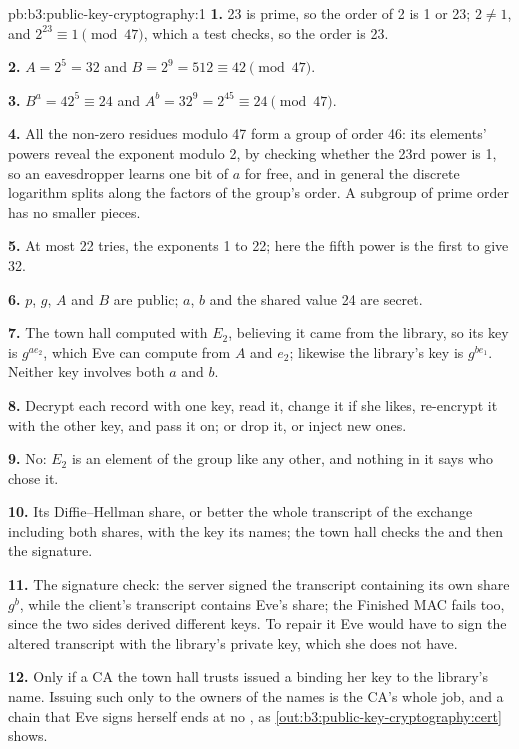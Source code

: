 \begin{solution}{pb:b3:public-key-cryptography:1}
\textbf{1.} 23 is prime, so the order of 2 is 1 or 23; $2 \ne 1$, and $2^{23} \equiv 1 \pmod{47}$, which a test checks, so the order is 23.

\textbf{2.} $A = 2^5 = 32$ and $B = 2^9 = 512 \equiv 42 \pmod{47}$.

\textbf{3.} $B^a = 42^5 \equiv 24$ and $A^b = 32^9 = 2^{45} \equiv 24 \pmod{47}$.

\textbf{4.} All the non-zero residues modulo 47 form a group of order 46: its elements' powers reveal the exponent modulo 2, by checking whether the 23rd power is 1, so an eavesdropper learns one bit of $a$ for free, and in general the discrete logarithm splits along the factors of the group's order. A subgroup of prime order has no smaller pieces.

\textbf{5.} At most 22 tries, the exponents 1 to 22; here the fifth power is the first to give 32.

\textbf{6.} $p$, $g$, $A$ and $B$ are public; $a$, $b$ and the shared value 24 are secret.

\textbf{7.} The town hall computed with $E_2$, believing it came from the library, so its key is $g^{a e_2}$, which Eve can compute from $A$ and $e_2$; likewise the library's key is $g^{b e_1}$. Neither key involves both $a$ and $b$.

\textbf{8.} Decrypt each record with one key, read it, change it if she likes, re-encrypt it with the other key, and pass it on; or drop it, or inject new ones.

\textbf{9.} No: $E_2$ is an element of the group like any other, and nothing in it says who chose it.

\textbf{10.} Its Diffie--Hellman share, or better the whole transcript of the exchange including both shares, with the key its  names; the town hall checks the  and then the signature.

\textbf{11.} The signature check: the server signed the transcript containing its own share $g^b$, while the client's transcript contains Eve's share; the Finished MAC fails too, since the two sides derived different keys. To repair it Eve would have to sign the altered transcript with the library's private key, which she does not have.

\textbf{12.} Only if a CA the town hall trusts issued a  binding her key to the library's name. Issuing such  only to the owners of the names is the CA's whole job, and a chain that Eve signs herself ends at no , as \cref{out:b3:public-key-cryptography:cert} shows.


\end{solution}
